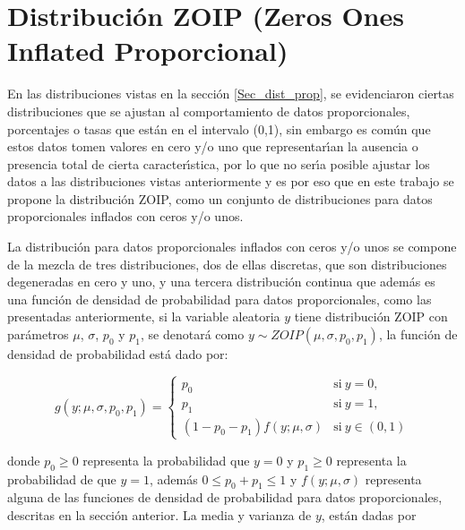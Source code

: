 \section{Distribuci\'{o}n ZOIP (Zeros Ones Inflated Proporcional)}\label{Sec_dist_zoip}

En las distribuciones vistas en la secci\'{o}n \ref{Sec_dist_prop}, se evidenciaron ciertas distribuciones que se ajustan al comportamiento de datos proporcionales, porcentajes o tasas que est\'{a}n en el intervalo (0,1), sin embargo es com\'{u}n que estos datos tomen valores en cero y/o uno que representar\'{\i}an la ausencia o presencia total de cierta caracter\'{\i}stica, por lo que no ser\'{\i}a posible ajustar los datos a las distribuciones vistas anteriormente y es por eso que en este trabajo se propone la distribuci\'{o}n ZOIP, como un conjunto de distribuciones para datos proporcionales inflados con ceros y/o unos.

La distribuci\'{o}n para datos proporcionales inflados con ceros y/o unos se compone de la mezcla de tres distribuciones, dos de ellas discretas, que son distribuciones degeneradas en cero y uno, y una tercera distribuci\'{o}n continua que adem\'{a}s es una funci\'{o}n de densidad de probabilidad para datos proporcionales, como las presentadas anteriormente, si la variable aleatoria $y$ tiene distribuci\'{o}n ZOIP con par\'{a}metros $\mu$, $\sigma$, $p_0$ y $p_1$, se denotar\'{a} como $y \sim ZOIP(\mu,\sigma, p_0, p_1)$, la funci\'{o}n de densidad de probabilidad est\'{a} dado por:

\begin{equation}
g(y;\mu,\sigma, p_{0}, p_{1})=
\begin{cases}
p_{0} & \text{si}\ y=0,\\
p_{1} & \text{si}\ y=1,\\
(1-p_{0}-p_{1})f(y;\mu,\sigma) & \text{si}\ y \in (0,1)
\end{cases}
 \label{eq_Dist_ZOIP}
\end{equation}

donde $p_{0} \geq 0$ representa la probabilidad que $y=0$ y $p_{1} \geq 0$ representa la probabilidad de que $y=1$, adem\'{a}s $0\leq p_{0}+p_{1}\leq 1$ y $f(y;\mu,\sigma)$ representa alguna de las funciones de densidad de probabilidad para datos proporcionales, descritas en la secci\'{o}n anterior. La media y varianza de $y$, est\'{a}n dadas por

